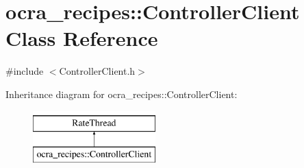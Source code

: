 \hypertarget{classocra__recipes_1_1ControllerClient}{}\section{ocra\+\_\+recipes\+:\+:Controller\+Client Class Reference}
\label{classocra__recipes_1_1ControllerClient}


{\ttfamily \#include $<$Controller\+Client.\+h$>$}

Inheritance diagram for ocra\+\_\+recipes\+:\+:Controller\+Client\+:\begin{figure}[H]
\begin{center}
\leavevmode
\includegraphics[height=2.000000cm]{df/d60/classocra__recipes_1_1ControllerClient}
\end{center}
\end{figure}
